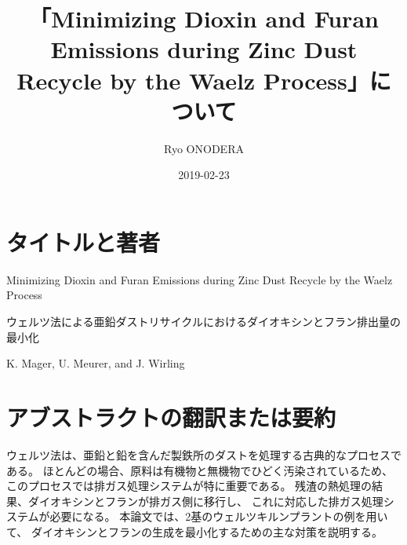\documentclass[a4j]{jsarticle}
\title{「Minimizing Dioxin and Furan Emissions during Zinc Dust Recycle
by the Waelz Process」について}
\author[1]{Ryo ONODERA}
\affil[1]{tetera.org}
\date{2019-02-23}
\begin{document}

\maketitle


\section{タイトルと著者}
Minimizing Dioxin and Furan Emissions during Zinc Dust Recycle
by the Waelz Process
~\cite{mager-jom-2003}

ウェルツ法による亜鉛ダストリサイクルにおけるダイオキシンとフラン排出量の最小化

K. Mager, U. Meurer, and J. Wirling


\section{アブストラクトの翻訳または要約}
ウェルツ法は、亜鉛と鉛を含んだ製鉄所のダストを処理する古典的なプロセスである。
ほとんどの場合、原料は有機物と無機物でひどく汚染されているため、
このプロセスでは排ガス処理システムが特に重要である。
残渣の熱処理の結果、ダイオキシンとフランが排ガス側に移行し、
これに対応した排ガス処理システムが必要になる。
本論文では、2基のウェルツキルンプラントの例を用いて、
ダイオキシンとフランの生成を最小化するための主な対策を説明する。
\end{document}
